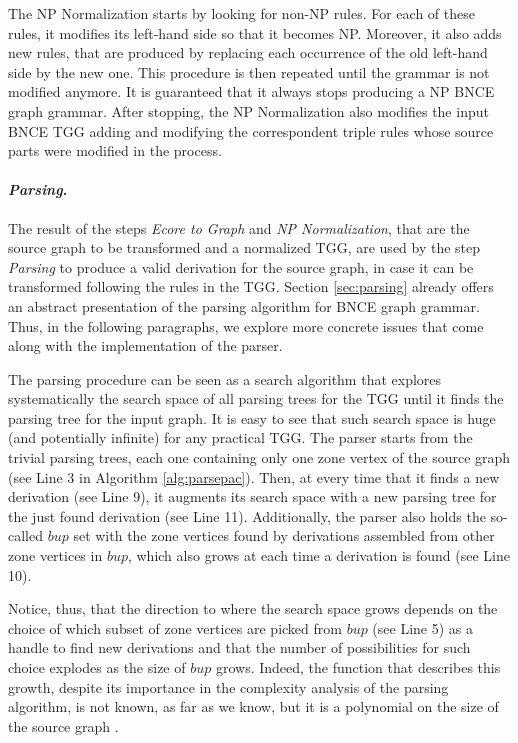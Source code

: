 The NP Normalization starts by looking for non-NP rules. For each of these rules, it modifies its left-hand side so that it becomes NP. Moreover, it also adds new rules, that are produced by replacing each occurrence of the old left-hand side by the new one. This procedure is then repeated until the grammar is not modified anymore. It is guaranteed that it always stops producing a NP BNCE graph grammar. After stopping, the NP Normalization also modifies the input BNCE TGG adding and modifying the correspondent triple rules whose source parts were modified in the process.

\paragraph*{\emph{Parsing}.} The result of the steps \emph{Ecore to Graph} and \emph{NP Normalization}, that are the source graph to be transformed and a normalized TGG, are used by the step \emph{Parsing} to produce a valid derivation for the source graph, in case it can be transformed following the rules in the TGG. Section \ref{sec:parsing} already offers an abstract presentation of the parsing algorithm for BNCE graph grammar. Thus, in the following paragraphs, we explore more concrete issues that come along with the implementation of the parser.

The parsing procedure can be seen as a search algorithm that explores systematically the search space of all parsing trees for the TGG until it finds the parsing tree for the input graph. It is easy to see that such search space is huge (and potentially infinite) for any practical TGG. The parser starts from the trivial parsing trees, each one containing only one zone vertex of the source graph (see Line 3 in Algorithm \ref{alg:parsepac}). Then, at every time that it finds a new derivation (see Line 9), it augments its search space with a new parsing tree for the just found derivation (see Line 11). Additionally, the parser also holds the so-called $bup$ set with the zone vertices found by derivations assembled from other zone vertices in $bup$, which also grows at each time a derivation is found (see Line 10).

Notice, thus, that the direction to where the search space grows depends on the choice of which subset of zone vertices are picked from $bup$ (see Line 5) as a handle to find new derivations and that the number of possibilities for such choice explodes as the size of $bup$ grows. Indeed, the function that describes this growth, despite its importance in the complexity analysis of the parsing algorithm, is not known, as far as we know, but it is a polynomial on the size of the source graph \cite[p. 160]{rozenberg1986boundary}.

